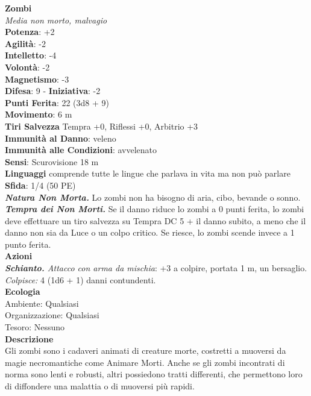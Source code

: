 \begin{multicols}{2}
\medskip\textbf{Zombi}\\
\emph{Media non morto, malvagio}\\
\textbf{Potenza}: +2\\
\textbf{Agilità}: -2\\
\textbf{Intelletto}: -4\\
\textbf{Volontà}: -2\\
\textbf{Magnetismo}: -3\\
\textbf{Difesa}: 9 - \textbf{Iniziativa}: -2\\
\textbf{Punti Ferita}: 22 (3d8 + 9)\\
\textbf{Movimento}: 6 m\\
\textbf{Tiri Salvezza}  Tempra +0, Riflessi +0, Arbitrio +3\\
\textbf{Immunità al Danno}: veleno\\
\textbf{Immunità alle Condizioni}: avvelenato\\
\textbf{Sensi}: Scurovisione 18 m\\
\textbf{Linguaggi} comprende tutte le lingue che parlava in vita ma non può parlare\\
\textbf{Sfida}: 1/4 (50 PE)\smallskip\\
\emph{\textbf{Natura Non Morta.}} Lo zombi non ha bisogno di aria, cibo, bevande o sonno.\\
\emph{\textbf{Tempra dei Non Morti.}} Se il danno riduce lo zombi a 0 punti ferita, lo zombi deve effettuare un tiro salvezza su Tempra DC 5 + il danno subito, a meno che il danno non sia da Luce o un colpo critico. Se riesce, lo zombi scende invece a 1 punto ferita.\\
\smallskip\textbf{Azioni}\\
\emph{\textbf{Schianto.} Attacco con arma da mischia}: +3 a colpire, portata 1 m, un bersaglio.\\
\emph{Colpisce:} 4 (1d6 + 1) danni contundenti.\\
\textbf{Ecologia}\\
Ambiente: Qualsiasi\\
Organizzazione: Qualsiasi\\
Tesoro: Nessuno\\
\textbf{Descrizione}\\
Gli zombi sono i cadaveri animati di creature morte, costretti a muoversi da magie necromantiche come Animare Morti. Anche se gli zombi incontrati di norma sono lenti e robusti, altri possiedono tratti differenti, che permettono loro di diffondere una malattia o di muoversi più rapidi.\\


\end{multicols}
